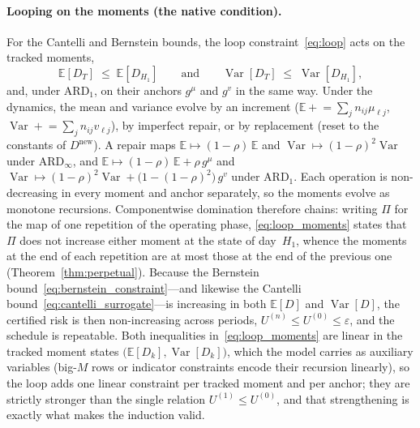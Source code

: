 \documentclass[11pt,a4paper]{article}
\theoremstyle{plain}
\theoremstyle{definition}
\theoremstyle{remark}
\begin{document}
\paragraph{Looping on the moments (the native condition).}
For the Cantelli and Bernstein bounds, the loop constraint~\eqref{eq:loop} acts on the tracked moments,
\begin{equation}\label{eq:loop_moments}
  \mathbb{E}[D_T] \;\le\; \mathbb{E}[D_{H_1}]
  \qquad\text{and}\qquad
  \operatorname{Var}[D_T] \;\le\; \operatorname{Var}[D_{H_1}],
\end{equation}
and, under $\text{ARD}_1$, on their anchors $g^{\mu}$ and $g^{v}$ in the same way.
Under the dynamics, the mean and variance evolve by an increment ($\mathbb{E} \mathrel{+}= \sum_j n_{ij}\mu_{\ell j}$, $\operatorname{Var} \mathrel{+}= \sum_j n_{ij} v_{\ell j}$), by imperfect repair, or by replacement (reset to the constants of $D^{\mathrm{new}}$).
A repair maps $\mathbb{E} \mapsto (1-\rho)\,\mathbb{E}$ and $\operatorname{Var} \mapsto (1-\rho)^2\operatorname{Var}$ under $\text{ARD}_\infty$, and $\mathbb{E} \mapsto (1-\rho)\,\mathbb{E} + \rho\, g^{\mu}$ and $\operatorname{Var} \mapsto (1-\rho)^2\operatorname{Var} + \bigl(1-(1-\rho)^2\bigr)\, g^{v}$ under $\text{ARD}_1$.
Each operation is non-decreasing in every moment and anchor separately, so the moments evolve as monotone recursions.
Componentwise domination therefore chains: writing $\Pi$ for the map of one repetition of the operating phase, \eqref{eq:loop_moments} states that $\Pi$ does not increase either moment at the state of day~$H_1$, whence the moments at the end of each repetition are at most those at the end of the previous one (Theorem~\ref{thm:perpetual}).
Because the Bernstein bound~\eqref{eq:bernstein_constraint}---and likewise the Cantelli bound~\eqref{eq:cantelli_surrogate}---is increasing in both $\mathbb{E}[D]$ and $\operatorname{Var}[D]$, the certified risk is then non-increasing across periods, $U^{(n)} \le U^{(0)} \le \varepsilon$, and the schedule is repeatable.
Both inequalities in~\eqref{eq:loop_moments} are linear in the tracked moment states $\bigl(\mathbb{E}[D_k],\operatorname{Var}[D_k]\bigr)$, which the model carries as auxiliary variables (big-$M$ rows or indicator constraints encode their recursion linearly), so the loop adds one linear constraint per tracked moment and per anchor; they are strictly stronger than the single relation $U^{(1)} \le U^{(0)}$, and that strengthening is exactly what makes the induction valid.
\end{document}
